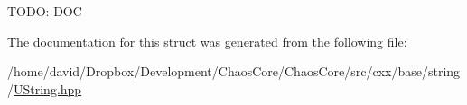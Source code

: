 T\-O\-D\-O\-: D\-O\-C 

The documentation for this struct was generated from the following file\-:\begin{DoxyCompactItemize}
\item 
/home/david/\-Dropbox/\-Development/\-Chaos\-Core/\-Chaos\-Core/src/cxx/base/string/\hyperlink{_u_string_8hpp}{U\-String.\-hpp}\end{DoxyCompactItemize}
